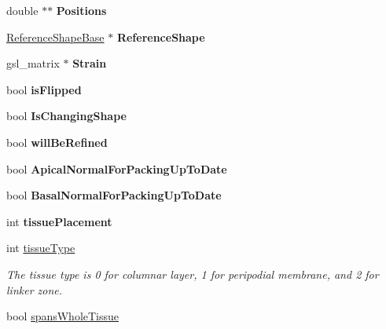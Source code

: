 \begin{DoxyCompactItemize}
\item 
\hypertarget{classShapeBase_ad6aa109b1f9c10680a0b601452bc78c2}{}double $\ast$$\ast$ {\bfseries Positions}\label{classShapeBase_ad6aa109b1f9c10680a0b601452bc78c2}

\item 
\hypertarget{classShapeBase_a4aee3861aaca88cf1b8e5bdc1ff7c872}{}\hyperlink{classReferenceShapeBase}{Reference\+Shape\+Base} $\ast$ {\bfseries Reference\+Shape}\label{classShapeBase_a4aee3861aaca88cf1b8e5bdc1ff7c872}

\item 
\hypertarget{classShapeBase_a4bda00f80968d836c647afe5f6d1fb36}{}gsl\+\_\+matrix $\ast$ {\bfseries Strain}\label{classShapeBase_a4bda00f80968d836c647afe5f6d1fb36}

\item 
\hypertarget{classShapeBase_a3da6d64116b5d73e2bb27d378035df41}{}bool {\bfseries is\+Flipped}\label{classShapeBase_a3da6d64116b5d73e2bb27d378035df41}

\item 
\hypertarget{classShapeBase_a994acea5e6f2cf92c94f485e7ba5afc9}{}bool {\bfseries Is\+Changing\+Shape}\label{classShapeBase_a994acea5e6f2cf92c94f485e7ba5afc9}

\item 
\hypertarget{classShapeBase_ac10b50666bb82b8dc7b08ce954402b02}{}bool {\bfseries will\+Be\+Refined}\label{classShapeBase_ac10b50666bb82b8dc7b08ce954402b02}

\item 
\hypertarget{classShapeBase_ac2bab1161a08d0d953702b7c8d1ff032}{}bool {\bfseries Apical\+Normal\+For\+Packing\+Up\+To\+Date}\label{classShapeBase_ac2bab1161a08d0d953702b7c8d1ff032}

\item 
\hypertarget{classShapeBase_a189180583fb224af63900411b2da53c6}{}bool {\bfseries Basal\+Normal\+For\+Packing\+Up\+To\+Date}\label{classShapeBase_a189180583fb224af63900411b2da53c6}

\item 
\hypertarget{classShapeBase_aff63b1fcb823bbfdb5b19fe78dea59b8}{}int {\bfseries tissue\+Placement}\label{classShapeBase_aff63b1fcb823bbfdb5b19fe78dea59b8}

\item 
\hypertarget{classShapeBase_a1d56f7eb3fed744adc268bc4da7a790f}{}int \hyperlink{classShapeBase_a1d56f7eb3fed744adc268bc4da7a790f}{tissue\+Type}\label{classShapeBase_a1d56f7eb3fed744adc268bc4da7a790f}

\begin{DoxyCompactList}\small\item\em The tissue type is 0 for columnar layer, 1 for peripodial membrane, and 2 for linker zone. \end{DoxyCompactList}\item 
\hypertarget{classShapeBase_adafe85bbee6173d2a321408cd8b63db3}{}bool \hyperlink{classShapeBase_adafe85bbee6173d2a321408cd8b63db3}{spans\+Whole\+Tissue}\label{classShapeBase_adafe85bbee6173d2a321408cd8b63db3}


\end{DoxyCompactItemize}
